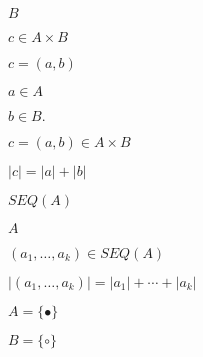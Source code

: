 \documentclass[10pt]{book}
\begin{document}
\begin{mdSnippets}
\begin{mdInlineSnippet}%
$B$\end{mdInlineSnippet}%
\begin{mdInlineSnippet}[7a381d436832fead188f4481d2235fb6]%
$c\in A\times B$\end{mdInlineSnippet}%
\begin{mdInlineSnippet}[d6ef0f98312ac5ec655fae115532ce14]%
$c = (a,b)$\end{mdInlineSnippet}%
\begin{mdInlineSnippet}[186d877666fa2c6f92794b782c19456a]%
$a\in A$\end{mdInlineSnippet}%
\begin{mdInlineSnippet}[89f46eecb6b02f2bb64e544df4251247]%
$b\in B.$\end{mdInlineSnippet}%
\begin{mdInlineSnippet}[d85c1b0673721de53a71b0624ebf7096]%
$c=(a,b)\in A\times B$\end{mdInlineSnippet}%
\begin{mdInlineSnippet}[5bfd6ae953cc5361679d57a6d2115176]%
$|c|=|a|+|b|$\end{mdInlineSnippet}%
\begin{mdInlineSnippet}%
$SEQ(A)$\end{mdInlineSnippet}%
\begin{mdInlineSnippet}[7fc56270e7a70fa81a5935b72eacbe29]%
$A$\end{mdInlineSnippet}%
\begin{mdInlineSnippet}%
$(a_1,\ldots,a_k)\in SEQ(A)$\end{mdInlineSnippet}%
\begin{mdInlineSnippet}[e2faed63a4e3ee2b569354b9a51cc2f5]%
$|(a_1,\ldots,a_k)|=|a_1|+\cdots+|a_k|$\end{mdInlineSnippet}%
\begin{mdInlineSnippet}[211c422ee01c8fb9e41ef95e024d5595]%
$A=\{\bullet\}$\end{mdInlineSnippet}%
\begin{mdInlineSnippet}[a367300403d4d148204e3fd2dc47780f]%
$B=\{\circ\}$\end{mdInlineSnippet}%

\end{mdSnippets}
\end{document}
